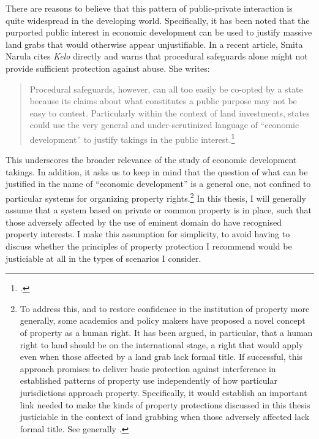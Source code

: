 There are reasons to believe that this pattern of public-private interaction is quite widespread in the developing world. Specifically, it has been noted that the purported public interest in economic development can be used to justify massive land grabs that would otherwise appear unjustifiable. In a recent article, Smita Narula cites {\it Kelo} directly and warns that procedural safeguards alone might not provide sufficient protection against abuse. She writes:

\begin{quote}
Procedural safeguards, however, can all too easily be co-opted by a state because its claims about what constitutes a public purpose may not be easy to contest. Particularly within the context of land investments, states could use the very general and under-scrutinized language of ``economic development'' to justify takings in the public interest.\footcite[157]{narula13}
\end{quote}

This underscores the broader relevance of the study of economic development takings. In addition, it asks us to keep in mind that the question of what can be justified in the name of ``economic development'' is a general one, not confined to particular systems for organizing property rights.\footnote{To address this, and to restore confidence in the institution of property more generally, some academics and policy makers have proposed a novel concept of property as a human right. It has been argued, in particular, that a human right to land should be  on the international stage, a right that would apply even when those affected by a land grab lack formal title. If successful, this approach promises to deliver basic protection against interference in established patterns of property use independently of how particular jurisdictions approach property. Specifically, it would establish an important link needed to make the kinds of property protections discussed in this thesis justiciable in the context of land grabbing when those adversely affected lack formal title. See generally \cite{schutter10,schutter11,kunnerman13}.} In this thesis, I will generally assume that a system based on private or common property is in place, such that those adversely affected by the use of eminent domain do have recognised property interests. I make this assumption for simplicity, to avoid having to discuss whether the principles of property protection I recommend would be justiciable at all in the types of scenarios I consider.

